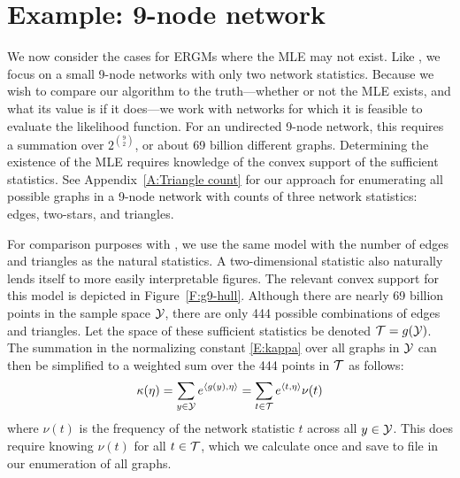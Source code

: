  
\section{Example: 9-node network} \label{S:Example:9node}
We now consider the cases for ERGMs where the MLE may not exist.
Like \citet{Handcock:degeneracy, Rinaldo:2009}, we focus on a small 9-node networks
with only two network statistics.  
Because we wish to compare our algorithm to the truth---whether or not the MLE exists, 
and what its value
is if it does---we work with networks for which it is feasible to 
evaluate the likelihood
function.  For an undirected 9-node network, this requires a summation 
over  $2^{{9\choose 2}}$, or about 69 billion different graphs.  Determining the existence of the MLE
requires knowledge of the convex support of the sufficient statistics.  See 
Appendix~\ref{A:Triangle count} for our approach for enumerating all possible 
graphs in a 9-node network with counts of three network statistics: edges, two-stars, and triangles.


For comparison purposes with \citet{Rinaldo:2009}, we use the same model with the number 
of edges and triangles as the natural statistics.  A two-dimensional statistic 
also naturally lends itself to more easily interpretable figures.  The relevant convex support for this model is depicted in Figure~\ref{F:g9-hull}.  Although there are nearly 69 billion points in the sample space ${\mathcal Y}$, there are only 444 possible combinations of edges and triangles.
Let the space of these sufficient statistics be denoted ${\mathcal T} = g({\mathcal Y})$.
The summation in the normalizing constant \eqref{E:kappa} over all graphs in ${\mathcal Y}$ can then be simplified
 to a weighted sum over the 444 points in ${\mathcal T}$ as follows:
\begin{align*}
	\kappa(\eta) = \sum_{y \in {\mathcal Y}} e^{\langle g(y),\eta \rangle } = 	\sum_{t \in {\mathcal T}} e^{\langle t,\eta \rangle } \nu(t)
\end{align*}
where $\nu(t)$ is the frequency of the network statistic $t$ across all $y \in {\mathcal Y}$.  
This does require knowing $\nu(t)$ for all $t \in {\mathcal T}$, which we calculate once
and save to file in our enumeration of all graphs.

